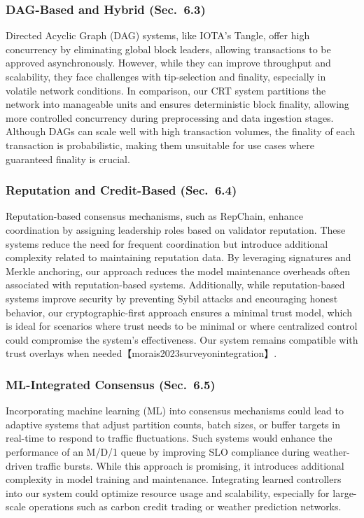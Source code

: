 \documentclass[12pt,onecolumn]{IEEEtran} %
\begin{document}
\subsubsection{DAG-Based and Hybrid (Sec.~6.3)}
Directed Acyclic Graph (DAG) systems, like IOTA’s Tangle, offer high concurrency by eliminating global block leaders, allowing transactions to be approved asynchronously. However, while they can improve throughput and scalability, they face challenges with tip-selection and finality, especially in volatile network conditions. In comparison, our CRT system partitions the network into manageable units and ensures deterministic block finality, allowing more controlled concurrency during preprocessing and data ingestion stages. Although DAGs can scale well with high transaction volumes, the finality of each transaction is probabilistic, making them unsuitable for use cases where guaranteed finality is crucial.

\subsubsection{Reputation and Credit-Based (Sec.~6.4)}
Reputation-based consensus mechanisms, such as RepChain, enhance coordination by assigning leadership roles based on validator reputation. These systems reduce the need for frequent coordination but introduce additional complexity related to maintaining reputation data. By leveraging signatures and Merkle anchoring, our approach reduces the model maintenance overheads often associated with reputation-based systems. Additionally, while reputation-based systems improve security by preventing Sybil attacks and encouraging honest behavior, our cryptographic-first approach ensures a minimal trust model, which is ideal for scenarios where trust needs to be minimal or where centralized control could compromise the system’s effectiveness. Our system remains compatible with trust overlays when needed【morais2023surveyonintegration】.

\subsubsection{ML-Integrated Consensus (Sec.~6.5)}
Incorporating machine learning (ML) into consensus mechanisms could lead to adaptive systems that adjust partition counts, batch sizes, or buffer targets in real-time to respond to traffic fluctuations. Such systems would enhance the performance of an M/D/1 queue by improving SLO compliance during weather-driven traffic bursts. While this approach is promising, it introduces additional complexity in model training and maintenance. Integrating learned controllers into our system could optimize resource usage and scalability, especially for large-scale operations such as carbon credit trading or weather prediction networks.
\end{document}

